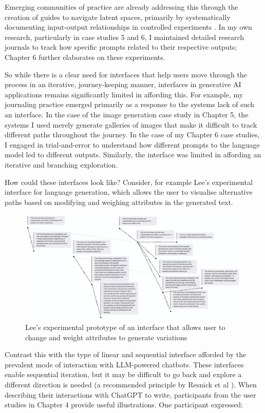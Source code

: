 Emerging communities of practice are already addressing this through the creation of guides to navigate latent spaces, primarily by systematically documenting input-output relationships in controlled experiments \cite{Smith2022-dm}. In my own research, particularly in case studies 5 and 6, I maintained detailed research journals to track how specific prompts related to their respective outputs; Chapter 6 further elaborates on these experiments.

So while there is a clear need for interfaces that help users move through the process in an iterative, journey-keeping manner, interfaces in generative AI applications remains significantly limited in affording this. For example, my journaling  practice emerged primarily as a response to the systems lack of such an interface. In the case of the image generation case study in Chapter 5, the systems I used merely generate galleries of images that make it difficult to track different paths throughout the journey. In the case of my Chapter 6 case studies, I engaged in trial-and-error to understand how different prompts to the language model led to different outputs. Similarly, the interface was limited in affording an iterative and branching exploration.

How could these interfaces look like? Consider, for example Lee's experimental interface for language generation, which allows the user to visualise alternative paths based on modifying and weighing attributes in the generated text. 

\begin{figure}[H]
    \centering
    \includegraphics[width=1\linewidth]{linuslee.png}
    \caption{Lee's experimental prototype of an interface that allows user to change and weight attributes to generate variations}
    \label{fig:linusleebranching}
\end{figure}


Contrast this with the type of linear and sequential interface afforded by the prevalent mode of interaction with LLM-powered chatbots. These interfaces enable sequential iteration, but it may be difficult to go back and explore a different direction is needed (a recommended principle by Resnick et al \cite{Resnick2005-fs}).  When describing their interactions with ChatGPT to write, participants from the user studies in Chapter 4 provide useful illustrations. One participant expressed:

